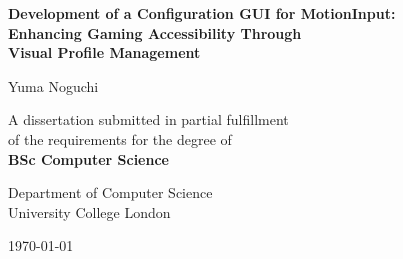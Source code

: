 \begin{titlepage}
    \begin{center}
        
        \vspace*{1cm}
        
        \Large
        \textbf{Development of a Configuration GUI for MotionInput:\\[0.5cm]
        Enhancing Gaming Accessibility Through\\[0.2cm]
        Visual Profile Management}
        
        \vspace{1.5cm}
        
        \normalsize
        Yuma Noguchi
        
        \vspace{1.5cm}
        
        A dissertation submitted in partial fulfillment \\
        of the requirements for the degree of \\
        \textbf{BSc Computer Science}
        
        \vspace{1.5cm}
        
        Department of Computer Science \\
        University College London
        
        \vspace{1cm}
        
        \today
        
    \end{center}
\end{titlepage}
